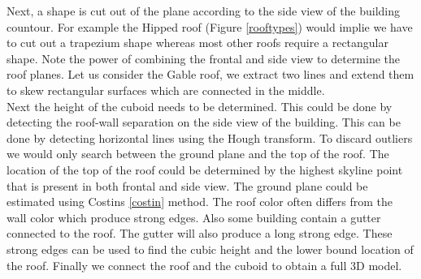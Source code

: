 Next, a shape is cut out of the plane according to the side view of the building countour.
For example the Hipped roof (Figure \ref{rooftypes}) would implie we have to cut
out a trapezium shape whereas most other roofs require a rectangular shape.
Note the power of combining the frontal and side view to determine the roof planes.
Let us consider the Gable roof, we extract two lines and extend them to skew
rectangular surfaces which are connected in the middle.\\

Next the height of the cuboid needs to be determined.
This could be done by detecting the roof-wall separation on the side view of the
building.  This can be done by detecting horizontal lines using the Hough
transform.
To discard outliers we would only search between the ground plane and the top of
the roof.  The location of the top of the roof could be determined by the highest skyline point that
is present in both frontal and side view. The ground plane could be estimated
using Costins \ref{costin} method.
The roof color often differs from the wall color which produce strong edges. Also
some building contain a gutter connected to the roof. The gutter will also
produce a long strong edge.  These strong edges can be used to find the cubic height
and the lower bound location of the roof.
Finally we connect the roof and the cuboid to obtain a full 3D model.
\\


